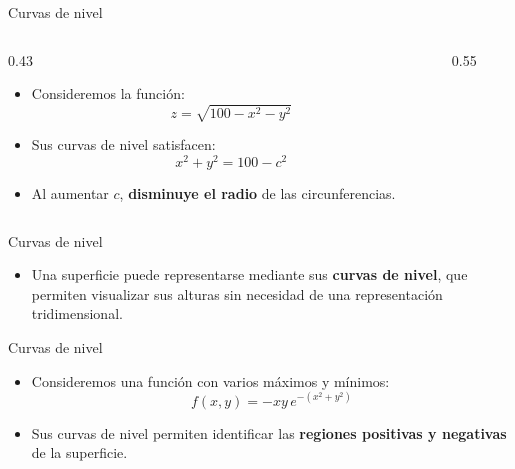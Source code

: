 \documentclass[main.tex]{subfiles}
\begin{document}
\begin{frame}{Curvas de nivel}
  \begin{columns}[c,onlytextwidth]
    \begin{column}{0.43\textwidth}
      \begin{itemize}
        \item Consideremos la función:
              \[
                z=\sqrt{100-x^2-y^2}
              \]

        \item Sus curvas de nivel satisfacen:
              \[
                x^2+y^2=100-c^2
              \]

        \item Al aumentar $c$, \textbf{disminuye el radio}
              de las circunferencias.
      \end{itemize}
    \end{column}
    \begin{column}{0.55\textwidth}
      \centering
    \end{column}
  \end{columns}
\end{frame}

\begin{frame}{Curvas de nivel}
  \begin{itemize}
    \item Una superficie puede representarse mediante sus
          \textbf{curvas de nivel}, que permiten visualizar sus alturas
          sin necesidad de una representación tridimensional.
  \end{itemize}

\end{frame}

\begin{frame}{Curvas de nivel}
  \begin{itemize}
    \item Consideremos una función con varios máximos y mínimos:
          \[
            f(x,y)=-xy\,e^{-(x^2+y^2)}
          \]

    \item Sus curvas de nivel permiten identificar las
          \textbf{regiones positivas y negativas} de la superficie.
  \end{itemize}

\end{frame}
\end{document}
